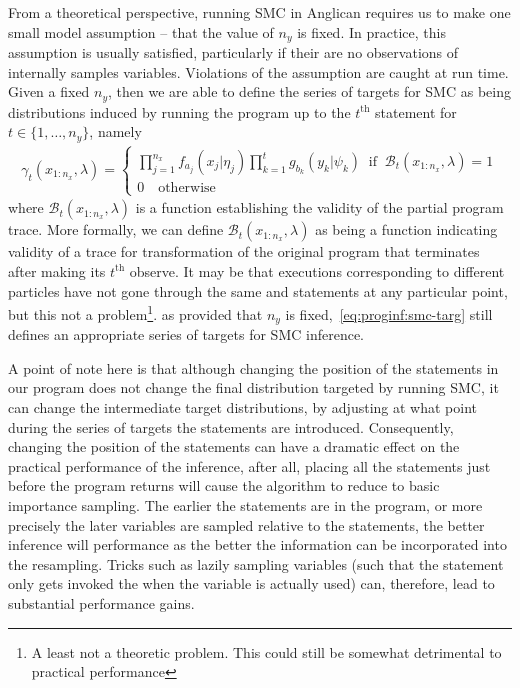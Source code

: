 From a theoretical perspective, running SMC in Anglican
requires us to make one small model assumption -- that the value of $n_y$ is fixed.  In
practice, this assumption is usually satisfied, particularly if their are no observations of
internally samples variables.  Violations of the assumption are caught at run time.  Given
a fixed $n_y$, then we are able to define the series of targets for SMC as being distributions
induced by running the program up to the $t^{\text{th}}$ \observe statement for $t\in\{1,\dots,n_y\}$,
namely
\begin{align}
\label{eq:proginf:smc-targ}
\gamma_t(x_{1:n_x}, \lambda) = \begin{cases}
\prod_{j=1}^{n_x} 
f_{a_j}(x_j | \eta_j)
\prod_{k=1}^{t}
g_{b_k}(y_k | \psi_k) \;\; \text{if} \;\; \mathcal{B}_t(x_{1:n_x},\lambda)=1 \\
0 \quad \text{otherwise}
\end{cases}
\end{align}
where $\mathcal{B}_t(x_{1:n_x},\lambda)$ is a function establishing the validity of the 
partial program trace.  More formally, we can define $\mathcal{B}_t(x_{1:n_x},\lambda)$ as
being a function indicating validity of a trace for transformation of the original program
that terminates after making its $t^{\text{th}}$ observe.
It may be that executions corresponding to different particles have not gone through the 
same \sample and \observe statements at any particular point, but this not a problem\footnote{A
	least not a theoretic problem.  This could still be somewhat detrimental to practical performance}.
as provided that $n_y$ is fixed,~\eqref{eq:proginf:smc-targ} still defines an appropriate
series of targets for SMC inference.

A point of note here is that although changing the position of the \observe statements in
our program does not change the final distribution targeted by running SMC, it can change
the intermediate target distributions, by adjusting at what point during the series of targets
the \sample statements are introduced.  Consequently, changing the position of the \observe
statements can have a dramatic effect on the practical performance of the inference, after all,
placing all the \observe statements just before the program returns will cause the algorithm
to reduce to basic importance sampling.  The earlier the \observe statements are in the program,
or more precisely the later variables are sampled relative to the \observe statements, the
better inference will performance as the better the information can be incorporated into
the resampling.  Tricks such as lazily sampling variables (such that the \sample statement
only gets invoked the when the variable is actually used) can, therefore, lead to substantial
performance gains.

